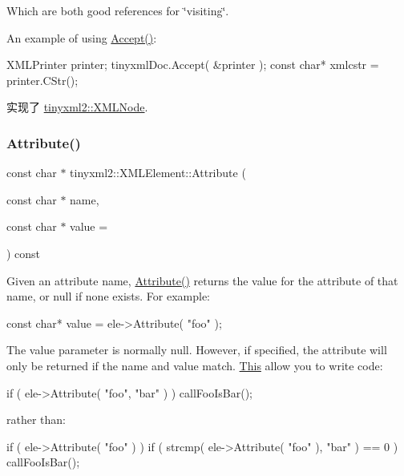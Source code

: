 Which are both good references for \char`\"{}visiting\char`\"{}.

An example of using \hyperlink{classtinyxml2_1_1_x_m_l_element_a9b2119831e8b85827d5d3e5076788e4a}{Accept()}\+: \begin{DoxyVerb}XMLPrinter printer;
tinyxmlDoc.Accept( &printer );
const char* xmlcstr = printer.CStr();
\end{DoxyVerb}
 

实现了 \hyperlink{classtinyxml2_1_1_x_m_l_node_a81e66df0a44c67a7af17f3b77a152785}{tinyxml2\+::\+X\+M\+L\+Node}.

\mbox{\label{classtinyxml2_1_1_x_m_l_element_a48cf4a315cfbac7d74cd0d5ff2c5df51}} 
\subsubsection{\texorpdfstring{Attribute()}{Attribute()}}
{\footnotesize\ttfamily const char $\ast$ tinyxml2\+::\+X\+M\+L\+Element\+::\+Attribute (\begin{DoxyParamCaption}\item[{const char $\ast$}]{name,  }\item[{const char $\ast$}]{value = {} }\end{DoxyParamCaption}) const}

Given an attribute name, \hyperlink{classtinyxml2_1_1_x_m_l_element_a48cf4a315cfbac7d74cd0d5ff2c5df51}{Attribute()} returns the value for the attribute of that name, or null if none exists. For example\+:

\begin{DoxyVerb}const char* value = ele->Attribute( "foo" );
\end{DoxyVerb}


The \textquotesingle{}value\textquotesingle{} parameter is normally null. However, if specified, the attribute will only be returned if the \textquotesingle{}name\textquotesingle{} and \textquotesingle{}value\textquotesingle{} match. \hyperlink{namespace_this}{This} allow you to write code\+:

\begin{DoxyVerb}if ( ele->Attribute( "foo", "bar" ) ) callFooIsBar();
\end{DoxyVerb}


rather than\+: \begin{DoxyVerb}if ( ele->Attribute( "foo" ) ) {
    if ( strcmp( ele->Attribute( "foo" ), "bar" ) == 0 ) callFooIsBar();
}
\end{DoxyVerb}
 \mbox{\label{classtinyxml2_1_1_x_m_l_element_aebd45aa7118964c30b32fe12e944628a}} 
